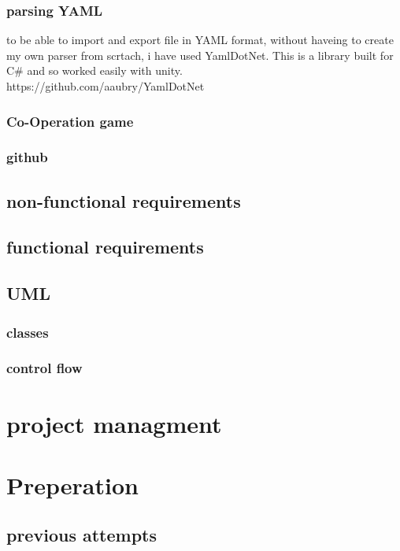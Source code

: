 \subsubsection*{parsing YAML}
to be able to import and export file in YAML format, without haveing to create my own parser from scrtach, i have used YamlDotNet. This is a library built for C\# and so worked easily with unity. \\
https://github.com/aaubry/YamlDotNet 
\subsubsection{Co-Operation game}
\subsubsection{github}

\subsection{non-functional requirements}

\subsection{functional requirements}

\subsection{UML}
\subsubsection{classes}
\subsubsection{control flow}

\section{project managment}

\section{Preperation}
\subsection{previous attempts}


